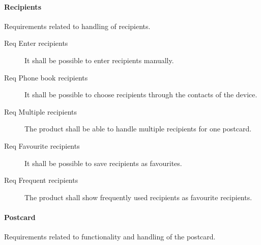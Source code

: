 \documentclass[10pt,a4paper]{article}
\begin{document}
\paragraph{Recipients}
Requirements related to handling of recipients.

\begin{description}
	\item [Req  Enter recipients] It shall be possible to enter recipients manually.
	\item [Req  Phone book recipients] It shall be possible to choose recipients through the contacts of the device.
	\item [Req  Multiple recipients] The product shall be able to handle multiple recipients for one postcard.
	\item [Req  Favourite recipients] It shall be possible to save recipients as favourites.
	\item [Req  Frequent recipients] The product shall show frequently used recipients as favourite recipients.
\end{description}

\paragraph{Postcard}
Requirements related to functionality and handling of the postcard.
\end{document}
